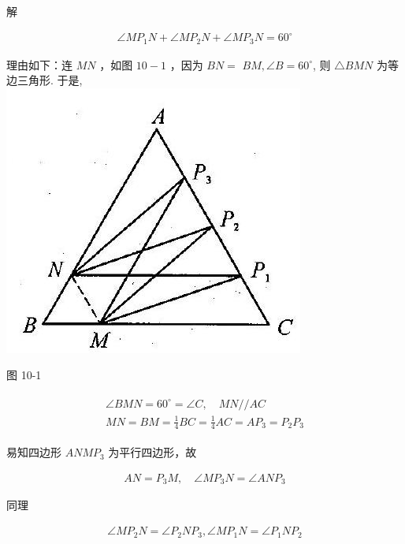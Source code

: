 \documentclass[10pt]{article}
\begin{document}
解

\begin{align*}
\angle M P_{1} N+\angle M P_{2} N+\angle M P_{3} N=60^{\circ}
\end{align*}

理由如下：连 $M N$ ，如图 $10-1$ ，因为 $B N=$ $B M, \angle B=60^{\circ}$, 则 $\triangle B M N$ 为等边三角形. 于是,\\
\includegraphics[max width=\textwidth, center]{2024_10_30_2c8f45efd4a519b08e1ag-095}

图 10-1

\begin{align*}
\begin{gathered}
\angle B M N=60^{\circ}=\angle C, \quad M N / / A C \\
M N=B M=\frac{1}{4} B C=\frac{1}{4} A C=A P_{3}=P_{2} P_{3}
\end{gathered}
\end{align*}

易知四边形 $A N M P_{3}$ 为平行四边形，故

\begin{align*}
A N=P_{3} M, \quad \angle M P_{3} N=\angle A N P_{3}
\end{align*}

同理

\begin{align*}
\angle M P_{2} N=\angle P_{2} N P_{3}, \angle M P_{1} N=\angle P_{1} N P_{2}
\end{align*}
\end{document}
